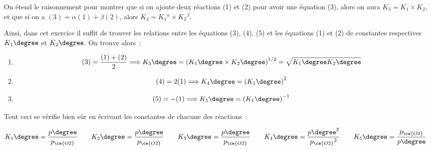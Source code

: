 \documentclass[a4paper, 12pt, final, garamond]{book}
\begin{document}
On étend le raisonnement pour montrer que si on ajoute deux réactions (1) et (2)
pour avoir une équation (3), alors on aura $K_3 = K_1\times K_2$, et que si on a
$(3) = \alpha(1) + \beta(2)$, alors $K_3 = K_1{}^{\alpha}\times
K_2{}^{\beta}$.\bigbreak

Ainsi, dans cet exercice il suffit de trouver les relations entre les équations
(3), (4), (5) et les équations (1) et (2) de constantes respectives $K_1\degree$
et $K_2\degree$. On trouve alors~:

\begin{enumerate}
    \item \[
            (3)
            = \frac{(1)+(2)}{2}
            \Longrightarrow
            K_3\degree
            = \left(K_1\degree\times K_2\degree\right)^{1/2}
            = \sqrt{K_1\degree K_2\degree}
        \]
    \item \[
            (4) = 2(1)
            \Longrightarrow
            K_4\degree
            = \left( K_1\degree \right)^2
        \]
    \item \[
            (5)
            = -(1)
            \Longrightarrow
            K_5\degree
            = \left( K_1\degree \right)^{-1}
        \]
\end{enumerate}

Tout ceci se vérifie bien sûr en écrivant les constantes de chacune des
réactions~:

\[
    K_1\degree = \frac{p\degree}{p_{\ce{O2}}}
    \qquad
    K_2\degree = \frac{p\degree}{p_{\ce{O2}}}
    \qquad
    K_3\degree = \frac{p\degree}{p_{\ce{O2}}}
    \qquad
    K_4\degree = \frac{p\degree^2}{p_{\ce{O2}}{}^2}
    \qquad
    K_5\degree = \frac{p_{\ce{O2}}}{p\degree}
\]
\end{document}

